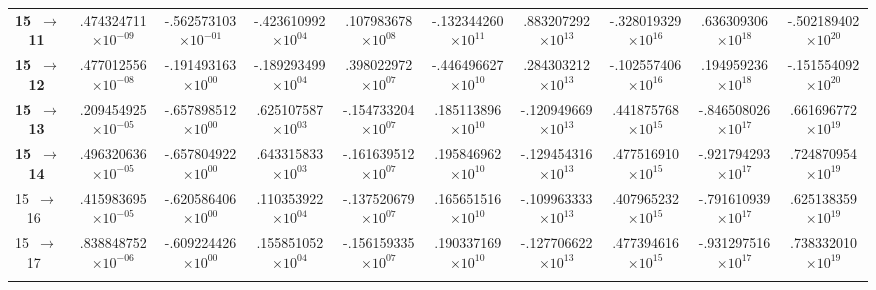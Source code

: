 \documentclass[reviewcopy]{elsarticle}
\begin{document}
\begin{landscape}
\begin{longtable}{lccccccccc}
{\bf 15~$\to$~ 11}  &   .474324711$\times10^{-09}$ & -.562573103$\times10^{-01}$ & -.423610992$\times10^{ 04}$ &  .107983678$\times10^{ 08}$ & -.132344260$\times10^{ 11}$ &  .883207292$\times10^{ 13}$ & -.328019329$\times10^{ 16}$ &  .636309306$\times10^{ 18}$ & -.502189402$\times10^{ 20}$ \\
{\bf 15~$\to$~ 12}  &   .477012556$\times10^{-08}$ & -.191493163$\times10^{ 00}$ & -.189293499$\times10^{ 04}$ &  .398022972$\times10^{ 07}$ & -.446496627$\times10^{ 10}$ &  .284303212$\times10^{ 13}$ & -.102557406$\times10^{ 16}$ &  .194959236$\times10^{ 18}$ & -.151554092$\times10^{ 20}$ \\
{\bf 15~$\to$~ 13}  &   .209454925$\times10^{-05}$ & -.657898512$\times10^{ 00}$ &  .625107587$\times10^{ 03}$ & -.154733204$\times10^{ 07}$ &  .185113896$\times10^{ 10}$ & -.120949669$\times10^{ 13}$ &  .441875768$\times10^{ 15}$ & -.846508026$\times10^{ 17}$ &  .661696772$\times10^{ 19}$ \\
{\bf 15~$\to$~ 14}  &   .496320636$\times10^{-05}$ & -.657804922$\times10^{ 00}$ &  .643315833$\times10^{ 03}$ & -.161639512$\times10^{ 07}$ &  .195846962$\times10^{ 10}$ & -.129454316$\times10^{ 13}$ &  .477516910$\times10^{ 15}$ & -.921794293$\times10^{ 17}$ &  .724870954$\times10^{ 19}$ \\
 15~$\to$~ 16  &   .415983695$\times10^{-05}$ & -.620586406$\times10^{ 00}$ &  .110353922$\times10^{ 04}$ & -.137520679$\times10^{ 07}$ &  .165651516$\times10^{ 10}$ & -.109963333$\times10^{ 13}$ &  .407965232$\times10^{ 15}$ & -.791610939$\times10^{ 17}$ &  .625138359$\times10^{ 19}$ \\
 15~$\to$~ 17  &   .838848752$\times10^{-06}$ & -.609224426$\times10^{ 00}$ &  .155851052$\times10^{ 04}$ & -.156159335$\times10^{ 07}$ &  .190337169$\times10^{ 10}$ & -.127706622$\times10^{ 13}$ &  .477394616$\times10^{ 15}$ & -.931297516$\times10^{ 17}$ &  .738332010$\times10^{ 19}$ \\[3pt]
\hline \\
\end{longtable}
\normalsize
\renewcommand{\thefootnote}{\arabic{footnote}}
\renewcommand{\arraystretch}{1.0}
\end{landscape}

\newpage
\end{document}
